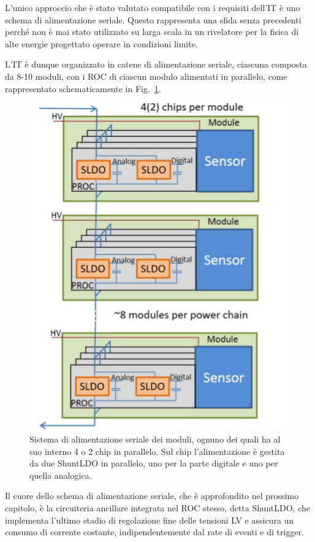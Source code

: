 L'unico approccio che \`e stato valutato compatibile con i requisiti dell'IT \`e uno schema di alimentazione seriale. Questo rappresenta una sfida senza precedenti perch\'e non \`e mai stato utilizzato su larga scala in un rivelatore per la fisica di alte energie progettato operare in condizioni limite.

L'IT \`e dunque organizzato in catene di alimentazione seriale, ciascuna composta da 8-10 moduli, con i ROC di ciascun modulo alimentati in parallelo, come rappresentato schematicamente in Fig.~\ref{serial}. 
\begin{figure}
\centering
\includegraphics[scale=0.4]{Immagini/serial}
\caption{Sistema di alimentazione seriale dei moduli, ognuno dei quali ha al suo interno 4 o 2 chip in parallelo. Sul chip l'alimentazione è gestita da due ShuntLDO in parallelo, uno per la parte digitale e uno per quella analogica.}
\label{serial}
\end{figure}
Il cuore dello schema di alimentazione seriale, che \`e approfondito nel prossimo capitolo, \`e la circuiteria ancillare integrata nel ROC stesso, detta ShuntLDO, che implementa l'ultimo stadio di regolazione fine delle tensioni LV e assicura un consumo di corrente costante, indipendentemente dal rate di eventi e di trigger.

